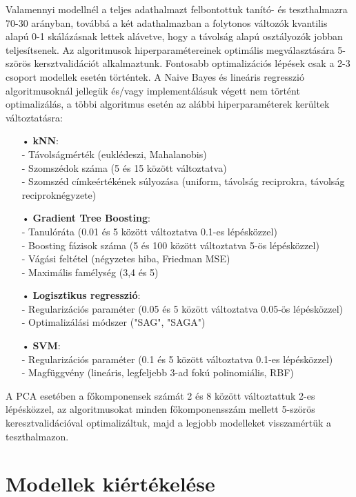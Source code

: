 \documentclass[12pt]{article}
\begin{document}
Valamennyi modellnél a teljes adathalmazt felbontottuk tanító- és teszthalmazra 70-30 arányban, továbbá a két adathalmazban a folytonos változók kvantilis alapú 0-1 skálázásnak lettek alávetve, hogy a távolság alapú osztályozók jobban teljesítsenek. Az algoritmusok hiperparamétereinek optimális megválasztására 5-szörös kersztvalidációt alkalmaztunk.  Fontosabb optimalizációs lépések csak a 2-3 csoport modellek esetén történtek. A Naive Bayes és lineáris regresszió algoritmusoknál jellegük és/vagy implementálásuk végett nem történt optimalizálás, a többi algoritmus esetén az alábbi hiperparaméterek kerültek változtatásra:
\begin{itemize}
\item[•] \textbf{kNN}: \\
- Távolságmérték (euklédeszi, Mahalanobis) \\
- Szomszédok száma (5 és 15 között változtatva) \\
- Szomszéd címkeértékének súlyozása (uniform, távolság reciprokra, távolság reciproknégyzete) 
\item[•] \textbf{Gradient Tree Boosting}: \\
- Tanulóráta (0.01 és 5 között változtatva 0.1-es lépésközzel)\\
- Boosting fázisok száma (5 és 100 között változtatva 5-ös lépésközzel)\\
- Vágási feltétel (négyzetes hiba, Friedman MSE) \\
- Maximális famélység (3,4 és 5)
\item[•] \textbf{Logisztikus regresszió}: \\
- Regularizációs paraméter (0.05 és 5 között változtatva 0.05-ös lépésközzel) \\
- Optimalizálási módszer ("SAG", "SAGA") 
\item[•] \textbf{SVM}: \\
- Regularizációs paraméter (0.1 és 5 között változtatva 0.1-es lépésközzel)\\
- Magfüggvény (lineáris, legfeljebb 3-ad fokú polinomiális, RBF)
\end{itemize}A PCA esetében a főkomponensek számát 2 és 8 között változtattuk 2-es lépésközzel, az algoritmusokat minden főkomponensszám mellett 5-szörös keresztvalidációval optimalizáltuk, majd a legjobb modelleket visszamértük a teszthalmazon.



\section{Modellek kiértékelése}
\end{document}
